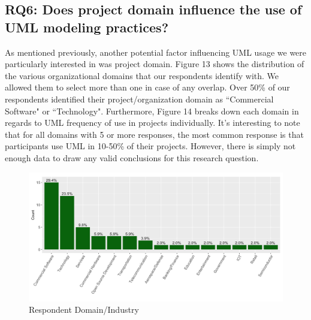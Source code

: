 \documentclass[letterpaper, 10 pt, conference]{ieeeconf}  %
\begin{document}
\subsection{RQ6: Does project domain influence the use of UML modeling practices?}

As mentioned previously, another potential factor influencing UML usage we were particularly interested in was project domain. Figure 13 shows the distribution of the various organizational domains that our respondents identify with. We allowed them to select more than one in case of any overlap. Over 50\% of our respondents identified their project/organization domain as ``Commercial Software" or ``Technology". Furthermore, Figure 14 breaks down each domain in regards to UML frequency of use in projects individually. It's interesting to note that for all domains with 5 or more responses, the most common response is that participants use UML in 10-50\% of their projects. However, there is simply not enough data to draw any valid conclusions for this research question.

	\begin{figure}[!htb]
      \centering
      \label{RQ6Concl}
   \end{figure}
   
	\begin{figure}[!htb]
      \centering
      \includegraphics[scale=0.25]{Plots/DomainPlot}
      \caption{Respondent Domain/Industry}
      \label{DomainPlot}
   \end{figure}
   
\end{document}
